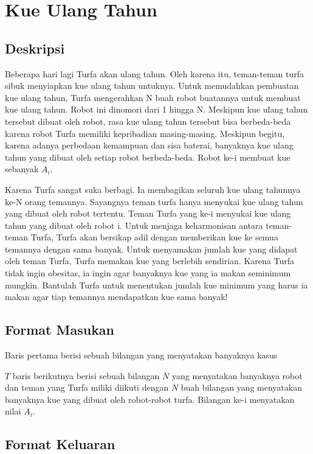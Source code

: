 \documentclass{article}
\begin{document}
\section*{\hfil Kue Ulang Tahun\hfil}

\subsection*{Deskripsi}
\par Beberapa hari lagi Turfa akan ulang tahun. Oleh karena itu, teman-teman turfa sibuk menyiapkan kue ulang tahun untuknya. Untuk memudahkan pembuatan kue ulang tahun, Turfa mengerahkan N buah robot buatannya untuk membuat kue ulang tahun. Robot ini dinomori dari 1 hingga N. Meskipun kue ulang tahun tersebut dibuat oleh robot, rasa kue ulang tahun tersebut bisa berbeda-beda karena robot Turfa memiliki kepribadian masing-masing. Meskipun begitu, karena adanya perbedaan kemampuan dan sisa baterai, banyaknya kue ulang tahun yang dibuat oleh setiap robot berbeda-beda. Robot ke-i membuat kue sebanyak $A_i$.
\par Karena Turfa sangat suka berbagi. Ia membagikan seluruh kue ulang tahunnya ke-N orang temannya. Sayangnya teman turfa hanya menyukai kue ulang tahun yang dibuat oleh robot tertentu. Teman Turfa yang ke-i menyukai kue ulang tahun yang dibuat oleh robot i. Untuk menjaga keharmonisan antara teman-teman Turfa, Turfa akan bersikap adil dengan memberikan kue ke semua temannya dengan sama banyak. Untuk menyamakan jumlah kue yang didapat oleh teman Turfa, Turfa memakan kue yang berlebih sendirian. Karena Turfa tidak ingin obesitas, ia ingin agar banyaknya kue yang ia makan seminimum mungkin. Bantulah Turfa untuk menentukan jumlah kue minimum yang harus ia makan agar tiap temannya mendapatkan kue sama banyak!

\subsection*{Format Masukan}
\par Baris pertama berisi sebuah bilangan yang menyatakan banyaknya kasus
\par $T$ baris berikutnya berisi sebuah bilangan $N$ yang menyatakan banyaknya robot dan teman yang Turfa miliki diikuti dengan $N$ buah bilangan yang menyatakan banyaknya kue yang dibuat oleh robot-robot turfa. Bilangan ke-i menyatakan nilai $A_i$.

\subsection*{Format Keluaran}
\end{document}
